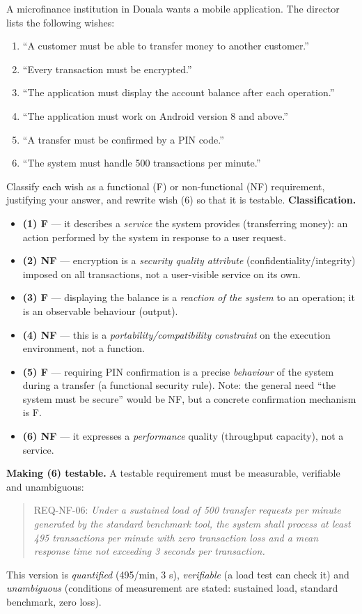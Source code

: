 \documentclass[11pt]{article}
\begin{document}
\begin{exoresolu}
A microfinance institution in Douala wants a mobile application. The director lists the following wishes:
\begin{enumerate}
\item[(1)] ``A customer must be able to transfer money to another customer.''
\item[(2)] ``Every transaction must be encrypted.''
\item[(3)] ``The application must display the account balance after each operation.''
\item[(4)] ``The application must work on Android version 8 and above.''
\item[(5)] ``A transfer must be confirmed by a PIN code.''
\item[(6)] ``The system must handle 500 transactions per minute.''
\end{enumerate}
Classify each wish as a functional (F) or non-functional (NF) requirement, justifying your answer, and rewrite wish (6) so that it is testable.
\tcblower
\textbf{Classification.}
\begin{itemize}
\item \textbf{(1) F} — it describes a \emph{service} the system provides (transferring money): an action performed by the system in response to a user request.
\item \textbf{(2) NF} — encryption is a \emph{security quality attribute} (confidentiality/integrity) imposed on all transactions, not a user-visible service on its own.
\item \textbf{(3) F} — displaying the balance is a \emph{reaction of the system} to an operation; it is an observable behaviour (output).
\item \textbf{(4) NF} — this is a \emph{portability/compatibility constraint} on the execution environment, not a function.
\item \textbf{(5) F} — requiring PIN confirmation is a precise \emph{behaviour} of the system during a transfer (a functional security rule). Note: the general need ``the system must be secure'' would be NF, but a concrete confirmation mechanism is F.
\item \textbf{(6) NF} — it expresses a \emph{performance} quality (throughput capacity), not a service.
\end{itemize}
\textbf{Making (6) testable.} A testable requirement must be measurable, verifiable and unambiguous:
\begin{quote}
REQ-NF-06: \emph{Under a sustained load of 500 transfer requests per minute generated by the standard benchmark tool, the system shall process at least 495 transactions per minute with zero transaction loss and a mean response time not exceeding 3 seconds per transaction.}
\end{quote}
This version is \emph{quantified} (495/min, 3 s), \emph{verifiable} (a load test can check it) and \emph{unambiguous} (conditions of measurement are stated: sustained load, standard benchmark, zero loss).
\end{exoresolu}
\end{document}
